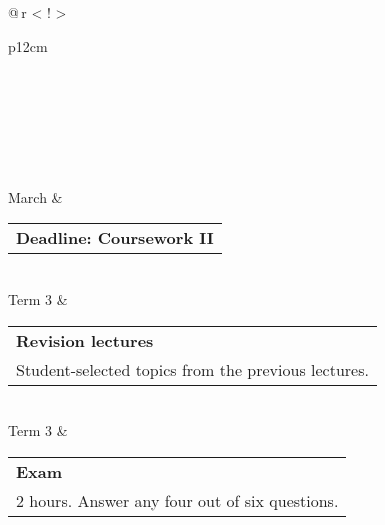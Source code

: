 \begin{longtable}{@{\,}r <{\hskip 2pt} !{\foo} >{\raggedright\arraybackslash}p{12cm}}
		 \\
		 \\
		 \\
		 \\
		 \\
		 \\
		 March & \begin{tabular}{p{13cm}}
			\textbf{Deadline: Coursework II} 
		\end{tabular}\\
		\hline
		Term 3 & \begin{tabular}{p{13cm}}
			\textbf{Revision lectures}  \\
			Student-selected topics from the previous lectures.
		\end{tabular}\\
		Term 3 & \begin{tabular}{p{13cm}}
			\textbf{Exam}  \\
			2 hours. Answer any four out of six questions.
		\end{tabular}
	\end{longtable}
\endgroup
